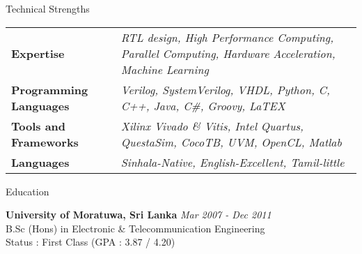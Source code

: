 \documentclass[
11pt, %
]{./assets/resume} %
\begin{document}
\begin{rSection}{Technical Strengths}
	
	\def\arraystretch{1.5}
	
	\begin{tabular}{p{2.0in} p{4.5in}}
		\textbf{Expertise} & \emph{RTL design, High Performance Computing, Parallel Computing, Hardware Acceleration, Machine Learning} \\
		\textbf{Programming Languages} & \emph{Verilog, SystemVerilog, VHDL, Python, C, C++, Java, C\#, Groovy, LaTEX} \\
		\textbf{Tools and Frameworks} & \emph{Xilinx Vivado \& Vitis, Intel Quartus, QuestaSim, CocoTB, UVM, OpenCL, Matlab} \\ 
		\textbf{Languages} & \emph{Sinhala-Native, English-Excellent, Tamil-little} \\
	\end{tabular}
	
\end{rSection}


\begin{rSection}{Education}
	
	\textbf{University of Moratuwa, Sri Lanka} \hfill \textit{Mar 2007 - Dec 2011} \\ 
	B.Sc (Hons) in Electronic \& Telecommunication Engineering \\
	Status : First Class (GPA : 3.87 / 4.20)
	
\end{rSection}

\end{document}
